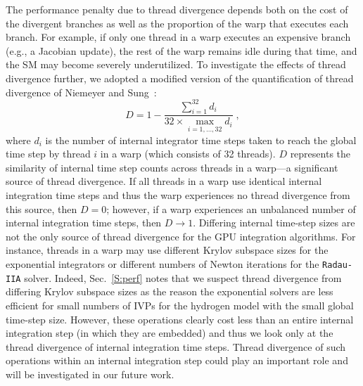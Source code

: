 \documentclass[preprint,review,11pt]{elsarticle}
\begin{document}
The performance penalty due to thread divergence depends both on the cost of the divergent branches as well as the proportion of the warp that executes each branch.
For example, if only one thread in a warp executes an expensive branch (e.g., a Jacobian update), the rest of the warp remains idle during that time, and the SM may become severely underutilized.
To investigate the effects of thread divergence further, we adopted a modified version of the quantification of thread divergence of Niemeyer and Sung~\cite{Niemeyer:2014aa}:
\begin{equation}
	D = 1 - \frac{\sum_{i=1}^{32}{d_i}}{32 \times \max\limits_{i = 1, \dots, 32} d_i} \;,
	\label{eqn:divergence}
\end{equation}
where $d_i$ is the number of internal integrator time steps taken to reach the global time step by thread $i$ in a warp (which consists of 32 threads).
$D$ represents the similarity of internal time step counts across threads in a warp---a significant source of thread divergence.
If all threads in a warp use identical internal integration time steps and thus the warp experiences no thread divergence from this source, then $D = 0$; however, if a warp experiences an unbalanced number of internal integration time steps, then $D \to 1$.
Differing internal time-step sizes are not the only source of thread divergence for the GPU integration algorithms.
For instance, threads in a warp may use different Krylov subspace sizes for the exponential integrators or different numbers of Newton iterations for the \texttt{Radau-IIA} solver.
Indeed, Sec.~\ref{S:perf} notes that we suspect thread divergence from differing Krylov subspace sizes as the reason the exponential solvers are less efficient for small numbers of IVPs for the hydrogen model with the small global time-step size.
However, these operations clearly cost less than an entire internal integration step (in which they are embedded) and thus we look only at the thread divergence of internal integration time steps.
Thread divergence of such operations within an internal integration step could play an important role and will be investigated in our future work.
\end{document}
